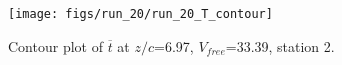 \begin{figure}[H]
\centering
\texttt{[image: figs/run\_20/run\_20\_T\_contour]}
\caption{Contour plot of $\overline{t}$ at $z/c$=6.97, $V_{free}$=33.39, station 2.}
\label{fig:run_20_T_contour}
\end{figure}


